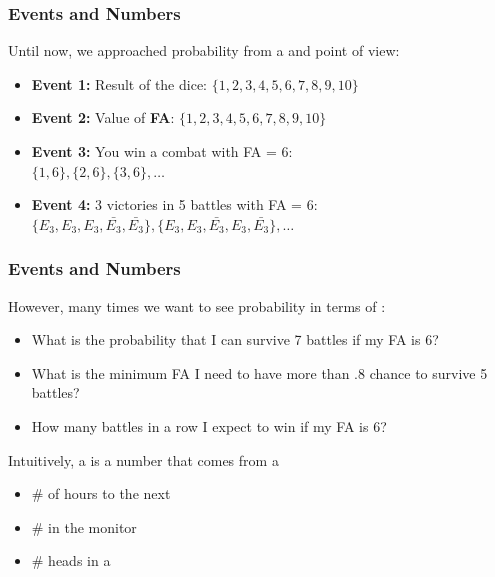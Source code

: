 \documentclass{beamer}
\begin{document}
\begin{frame}
  \frametitle{Events and Numbers}

  Until now, we approached probability from a  and
   point of view:
  \begin{itemize}
  \item {\bf Event 1:} Result of the dice: $\{1,2,3,4,5,6,7,8,9,10\}$
  \item {\bf Event 2:} Value of {\bf FA}: $\{1,2,3,4,5,6,7,8,9,10\}$
  \item {\bf Event 3:} You win a combat with FA = 6:\\
    $\{1,6\}, \{2,6\}, \{3,6\}, \ldots$
  \item {\bf Event 4:} 3 victories in 5 battles with FA = 6:\\ $\{E_3,
    E_3, E_3, \bar{E_3}, \bar{E_3}\}, \{E_3, E_3, \bar{E_3}, E_3,
    \bar{E_3}\}, \ldots$
  \end{itemize}
\end{frame}

\begin{frame}
  \frametitle{Events and Numbers}

  However, many times we want to see probability in terms of
  :
  \begin{itemize}
  \item What is the probability that I can \alert{survive 7 battles}
    if my FA is 6?
  \item What is the \alert{minimum FA} I need to have more than .8
    chance to survive 5 battles?
  \item \alert{How many battles in a row} I expect to win if my FA is 6?
  \end{itemize}

  \vfill
  
  Intuitively, a  is a number that comes from
  a 
  \begin{itemize}
  \item \# of hours to the next 
  \item \#  in the monitor
  \item \# heads in a 
  \end{itemize}
\end{frame}
\end{document}

